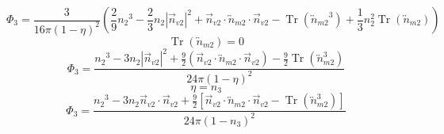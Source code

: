 \documentclass[letterpaper,twocolumn,amsmath,amssymb,prb]{revtex4-1}
\begin{document}
\begin{widetext}
\[{}\]
\begin{equation}{\Phi_3=\frac{3}{16\pi(1-\eta)^2}\left(\frac{2}{9}{n_2}^3-\frac{2}{3}n_2|\vec{n}_{v2}|^2+\vec{n}_{v2}\cdot{\overleftrightarrow{n}_{m2}}\cdot{\vec{n}_{v2}}-\operatorname{Tr}({\overleftrightarrow{n}_{m2}}^3)+\frac{1}{3}n^2_2\operatorname{Tr}(\overleftrightarrow{n}_{m2})\right)}\end{equation} 
\[{}\]
\begin{equation}{\operatorname{Tr}(\overleftrightarrow{n}_{m2})=0}\end{equation} 
\[{}\]
\begin{equation}{\Phi_3=\frac{{n_2}^3-3n_2|\vec{n}_{v2}|^2+\frac{9}{2}(\vec{n}_{v2}\cdot{\overleftrightarrow{n}_{m2}}\cdot{\vec{n}_{v2}})-\frac{9}{2}\operatorname{Tr}({\overleftrightarrow{n}^3_{m2}})}{24\pi(1-\eta)^2}}\end{equation} 
\[{}\]
\begin{equation}{\eta=n_3}\end{equation} 
\[{}\]
\begin{equation}{\Phi_3=\frac{{n_2}^3-3n_2\vec{n}_{v2}\cdot\vec{n}_{v2}+\frac{9}{2}[\vec{n}_{v2}\cdot{\overleftrightarrow{n}_{m2}}\cdot{\vec{n}_{v2}}-\operatorname{Tr}({\overleftrightarrow{n}^3_{m2}})]}{24\pi(1-n_3)^2}}\end{equation} 
\end{widetext}
\end{document}
